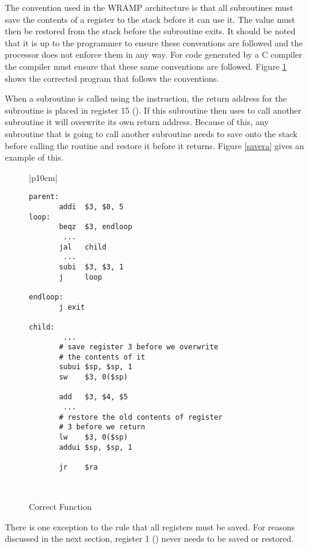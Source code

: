 The convention used in the WRAMP architecture is that all subroutines
must save the contents of a register to the stack before it can use
it. The value must then be restored from the stack before the
subroutine exits. It should be noted that it is up to the programmer
to ensure these conventions are followed and the processor does not
enforce them in any way. For code generated by a C compiler the
compiler must ensure that these same conventions are followed.  Figure
\ref{fig:correctcode} shows the corrected program that follows the
conventions.

When a subroutine is called using the  instruction, the
return address for the subroutine is placed in register 15
(). If this subroutine then uses  to call another
subroutine it will overwrite its own return address.  Because of this,
any subroutine that is going to call another subroutine needs to save
 onto the stack before calling the routine and restore it
before it returns.  Figure \ref{savera} gives an example of this.


%
%
\begin{figure}[!hb]
\begin{footnotesize}
\begin{center}
\begin{tabular}{|p{10cm}|}
\hline
\begin{verbatim}
parent:
       addi  $3, $0, 5
loop:
       beqz  $3, endloop
        ...
       jal   child
        ...
       subi  $3, $3, 1
       j     loop

endloop:
       j exit

child:
        ...
       # save register 3 before we overwrite
       # the contents of it
       subui $sp, $sp, 1
       sw    $3, 0($sp)

       add   $3, $4, $5
        ...
       # restore the old contents of register
       # 3 before we return
       lw    $3, 0($sp)
       addui $sp, $sp, 1

       jr    $ra
\end{verbatim}
\\
\hline
\end{tabular}
\end{center}
\end{footnotesize}
\caption{Correct Function}
\label{fig:correctcode}
\end{figure}


There is one exception to the rule that all registers must be
saved. For reasons discussed in the next section, register 1
() never needs to be saved or restored.

